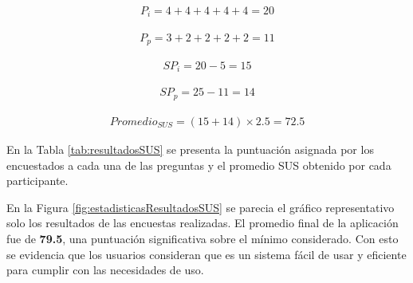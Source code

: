 \begin{equation}
    \begin{aligned}
        P_i = 4 + 4 + 4 + 4 + 4 = 20
    \end{aligned}
\end{equation}

\begin{equation}
    \begin{aligned}
        P_p = 3 + 2 + 2 + 2 + 2 = 11
    \end{aligned}
\end{equation}

\begin{equation}
    \begin{aligned}
        SP_i = 20 - 5 = 15
    \end{aligned}
\end{equation}

\begin{equation}
    \begin{aligned}
        SP_p = 25 - 11 = 14
    \end{aligned}
\end{equation}

\begin{equation}
    \begin{aligned}
        Promedio_{SUS} = (15 + 14) \times 2.5 = 72.5
    \end{aligned}
\end{equation}


En la Tabla \ref{tab:resultadosSUS} se presenta la puntuación asignada por los encuestados a cada una de las preguntas y el promedio SUS obtenido por cada participante.



En la Figura \ref{fig:estadisticasResultadosSUS} se parecia el gráfico representativo solo los resultados de las encuestas realizadas. El promedio final de la aplicación fue de \textbf{79.5}, una puntuación significativa sobre el mínimo considerado. Con esto se evidencia que los usuarios consideran que es un sistema fácil de usar y eficiente para cumplir con las necesidades de uso.

